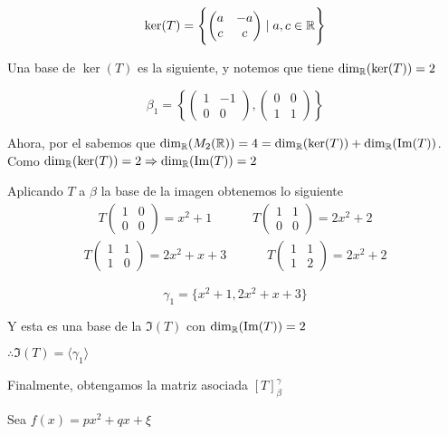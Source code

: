 \begin{proofexplanation}
    $$\ker(T) = \left\{ \begin{pmatrix} a & -a \\ c & c \end{pmatrix} \mid a,c \in \mathbb{R} \right\}$$

    Una base de $\ker(T)$ es la siguiente, y notemos que tiene ${\dim}_{\mathbb{R}}(\ker(T)) = 2$

    $$\beta_1 = \left\{ \begin{pmatrix} 1 & -1 \\ 0 & 0 \end{pmatrix}, \begin{pmatrix} 0 & 0 \\ 1 & 1 \end{pmatrix} \right\}$$
    
    Ahora, por el  sabemos que ${\dim}_{\mathbb{R}}(M_2(\mathbb{R})) = 4 = {\dim}_{\mathbb{R}}(\ker(T)) + {\dim}_{\mathbb{R}}(\Im(T))$. Como ${\dim}_{\mathbb{R}}(\ker(T)) = 2 \Rightarrow {\dim}_{\mathbb{R}}(\Im(T)) = 2$

    Aplicando $T$ a $\beta$ la base de la imagen obtenemos lo siguiente
    \begin{align*}
       T \begin{pmatrix} 1 & 0 \\ 0 & 0 \end{pmatrix} = x^2 + 1 && && T \begin{pmatrix} 1 & 1 \\ 0 & 0 \end{pmatrix} = 2x^2 + 2
    \end{align*}
    \begin{align*}
       T \begin{pmatrix} 1 & 1 \\ 1 & 0 \end{pmatrix} = 2x^2 + x + 3 && && T \begin{pmatrix} 1 & 1 \\ 1 & 2 \end{pmatrix} = 2x^2 + 2
    \end{align*}

    $$\gamma_1 = \{ x^2 + 1, 2x^2 + x + 3\}$$

    Y esta es una base de la $\Im(T)$ con ${\dim}_{\mathbb{R}}(\Im(T)) = 2$

    $\therefore \Im(T) = \langle \gamma_1 \rangle$

    Finalmente, obtengamos la matriz asociada ${\left[ T \right]}_{\beta}^{\gamma}$

    Sea $f(x) = px^2 + qx + \xi$


\end{proofexplanation}
